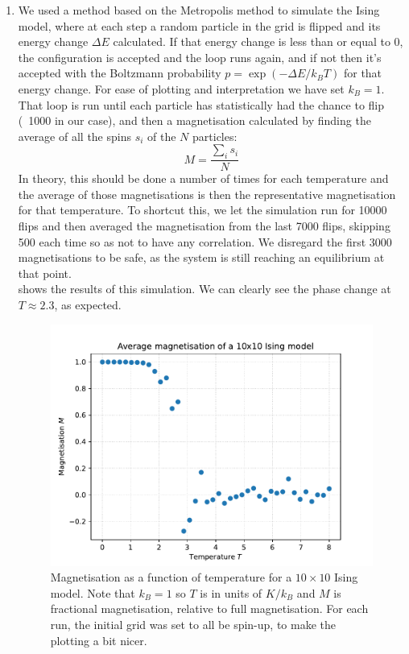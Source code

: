 \documentclass[11pt]{article}
\begin{document}
\begin{enumerate}
    \item We used a method based on the Metropolis method to simulate the Ising model, where at each step a random particle in the grid is flipped and its energy change $\Delta E$ calculated. If that energy change is less than or equal to 0, the configuration is accepted and the loop runs again, and if not then it's accepted with the Boltzmann probability $p=\exp(-\Delta E/k_B T)$ for that energy change. For ease of plotting and interpretation we have set $k_B=1$. \\
    That loop is run until each particle has statistically had the chance to flip (~\num[]{1000} in our case), and then a magnetisation calculated by finding the average of all the spins $s_i$ of the $N$ particles:
    \begin{equation*}
        M=\frac{\sum_i s_i}{N}
    \end{equation*}
    In theory, this should be done a number of times for each temperature and the average of those magnetisations is then the representative magnetisation for that temperature. To shortcut this, we let the simulation run for \num[]{10000} flips and then averaged the magnetisation from the last \num[]{7000} flips, skipping \num[]{500} each time so as not to have any correlation. We disregard the first \num[]{3000} magnetisations to be safe, as the system is still reaching an equilibrium at that point.\\
     shows the results of this simulation. We can clearly see the phase change at $T\approx2.3$, as expected. 
    
    \begin{figure}[h]
        \begin{center}
            \includegraphics[width=.6\textwidth]{Plots/q2.pdf}
            \caption{Magnetisation as a function of temperature for a $10\times10$ Ising model. Note that $k_B=1$ so $T$ is in units of $K/k_B$ and $M$ is fractional magnetisation, relative to full magnetisation. For each run, the initial grid was set to all be spin-up, to make the plotting a bit nicer.}
            \label{fig:q2}
        \end{center}
    \end{figure}

    


\end{enumerate}
\end{document}
